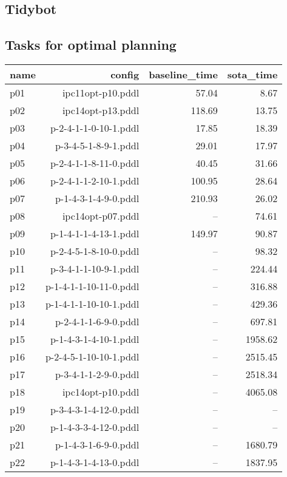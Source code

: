 \documentclass{article}
\begin{document}
                \newpage \subsection{Tidybot}
                    \subsection*{Tasks for optimal planning}
                    
                            \begin{center}
                            \scriptsize
                            \begin{tabular}{@{}l|r|r|r@{}}
                            name & config & baseline\_time & sota\_time\\\midrule
                              p01& ipc11opt-p10.pddl&57.04&8.67\\
  p02& ipc14opt-p13.pddl&118.69&13.75\\
  p03& p-2-4-1-1-0-10-1.pddl&17.85&18.39\\
  p04& p-3-4-5-1-8-9-1.pddl&29.01&17.97\\
  p05& p-2-4-1-1-8-11-0.pddl&40.45&31.66\\
  p06& p-2-4-1-1-2-10-1.pddl&100.95&28.64\\
  p07& p-1-4-3-1-4-9-0.pddl&210.93&26.02\\
  p08& ipc14opt-p07.pddl&--&74.61\\
  p09& p-1-4-1-1-4-13-1.pddl&149.97&90.87\\
  p10& p-2-4-5-1-8-10-0.pddl&--&98.32\\
  p11& p-3-4-1-1-10-9-1.pddl&--&224.44\\
  p12& p-1-4-1-1-10-11-0.pddl&--&316.88\\
  p13& p-1-4-1-1-10-10-1.pddl&--&429.36\\
  p14& p-2-4-1-1-6-9-0.pddl&--&697.81\\
  p15& p-1-4-3-1-4-10-1.pddl&--&1958.62\\
  p16& p-2-4-5-1-10-10-1.pddl&--&2515.45\\
  p17& p-3-4-1-1-2-9-0.pddl&--&2518.34\\
  p18& ipc14opt-p10.pddl&--&4065.08\\
  p19& p-3-4-3-1-4-12-0.pddl&--&--\\
  p20& p-1-4-3-3-4-12-0.pddl&--&--\\
  p21& p-1-4-3-1-6-9-0.pddl&--&1680.79\\
  p22& p-1-4-3-1-4-13-0.pddl&--&1837.95\\

\end{tabular}
\end{center}
\end{document}
